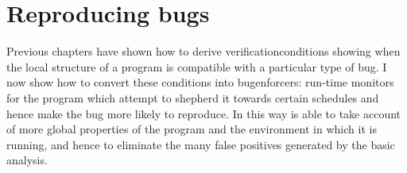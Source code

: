\chapter{Reproducing bugs}
\label{sect:reproducing_bugs}

Previous chapters have shown how to derive
\glspl{verificationcondition} showing when the local structure of a
program is compatible with a particular type of bug.  I now show how
to convert these conditions into \glspl{bugenforcer}: run-time
monitors for the program which attempt to shepherd it towards certain
schedules and hence make the bug more likely to reproduce.  In this
way {\technique} is able to take account of more global properties of
the program and the environment in which it is running, and hence to
eliminate the many false positives generated by the basic analysis.

